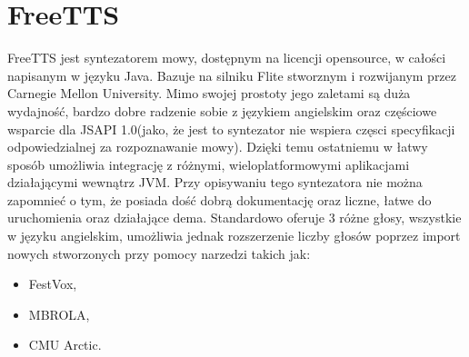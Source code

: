 \section{FreeTTS}
FreeTTS jest syntezatorem mowy, dostępnym na licencji opensource, w całości napisanym w języku Java. Bazuje na silniku Flite stworznym i rozwijanym przez Carnegie Mellon University. Mimo swojej prostoty jego zaletami są duża wydajność, bardzo dobre radzenie sobie z językiem angielskim oraz częściowe wsparcie dla JSAPI 1.0(jako, że jest to syntezator nie wspiera częsci specyfikacji odpowiedzialnej za rozpoznawanie mowy). Dzięki temu ostatniemu w łatwy sposób umożliwia integrację z różnymi, wieloplatformowymi aplikacjami działającymi wewnątrz JVM. Przy opisywaniu tego syntezatora nie można zapomnieć o tym, że posiada dość dobrą dokumentację oraz liczne, łatwe do uruchomienia oraz działające dema. Standardowo oferuje 3 różne głosy, wszystkie w języku angielskim, umożliwia jednak rozszerzenie liczby głosów poprzez import nowych stworzonych przy pomocy narzedzi takich jak:
	\begin{itemize}
		\item FestVox,
		\item MBROLA,
		\item CMU Arctic.
	\end{itemize}    

